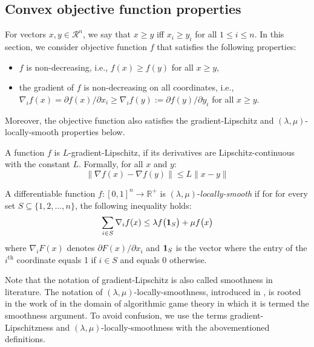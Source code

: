 \subsection{Convex objective function properties} \label{sec:f-properties}

For vectors $x, y \in \mathcal{R}^{n}$, we say that $x \geq y$ iff $x_{i} \geq y_{i}$ for all $1 \leq i \leq n$. 
In this section, we consider objective function $f$ that satisfies the following properties:
\begin{itemize}
	\item $f$ is non-decreasing, i.e., $f(x) \geq f(y)$ for all $x \geq y$,
	\item the gradient of $f$ is non-decreasing on all coordinates, i.e., $\nabla_{i} f(x) = \partial f(x)/\partial x_{i} \geq \nabla_{i} f(y) := \partial f(y)/\partial y_{i}$ for all $x \geq y$.
\end{itemize}
%
Moreover, the objective function also satisfies the gradient-Lipschitz and $(\lambda,\mu)$-locally-smooth properties below.


\begin{definition}
    A function $f$ is $L$-gradient-Lipschitz, if its derivatives are Lipschitz-continuous with the constant $L$. Formally, for all $x$ and $y$:
    \[\|\nabla f(x) - \nabla f(y)\| \le L \|x - y\|\]
\end{definition}

\begin{definition}
    A differentiable function $f: [0,1]^{n} \rightarrow \mathbb{R}^{+}$ is $(\lambda,\mu)$-\emph{locally-smooth}
    if for  for every set $S \subseteq \{1, 2, \ldots, n\}$, the following inequality holds:
    \begin{equation*}	\label{eq:min-local-smooth}
    \sum_{i \in S} \nabla_{i} f(x) \leq \lambda f\bigl( \mathbf{1}_{S} \bigr) + \mu f\bigl( x \bigr)
    \end{equation*}
    where $\nabla_{i} F(x)$ denotes $\partial F(x)/\partial x_{i}$ and $\mathbf{1}_{S}$ is the vector where the entry of the $i^{\text{th}}$ coordinate equals 1 if $i \in S$
    and equals 0 otherwise.
\end{definition}

Note that the notation of gradient-Lipschitz is also called smoothness in literature. The notation of $(\lambda,\mu)$-locally-smoothness, introduced in \cite{Thang20:Online-Primal-Dual}, is rooted in the work of \cite{Roughgarden15:Intrinsic-Robustness} 
in the domain of algorithmic game theory in which it is termed the smoothness argument. 
To avoid confusion, we use the terms gradient-Lipschitzness and $(\lambda,\mu)$-locally-smoothness with the abovementioned definitions. 

